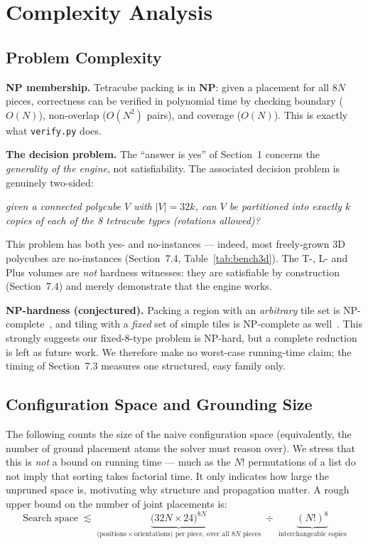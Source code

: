 \documentclass[a4paper,UKenglish,cleveref,autoref]{lipics-v2021}
\begin{document}
\section{Complexity Analysis}

\subsection{Problem Complexity}

\textbf{NP membership.}  Tetracube packing is in $\mathbf{NP}$: given a
placement for all $8N$ pieces, correctness can be verified in polynomial time
by checking boundary ($O(N)$), non-overlap ($O(N^2)$ pairs), and coverage
($O(N)$).  This is exactly what \texttt{verify.py} does.

\textbf{The decision problem.}  The ``answer is yes'' of Section~1 concerns the
\emph{generality of the engine}, not satisfiability.  The associated decision
problem is genuinely two-sided:

\begin{center}
\emph{given a connected polycube $V$ with $|V| = 32k$, can $V$ be partitioned
into exactly $k$ copies of each of the 8 tetracube types (rotations allowed)?}
\end{center}

This problem has both yes- and no-instances --- indeed, most freely-grown 3D
polycubes are no-instances (Section~7.4, Table~\ref{tab:bench3d}).  The T-, L-
and Plus volumes are \emph{not} hardness witnesses: they are satisfiable by
construction (Section~7.4) and merely demonstrate that the engine works.

\textbf{NP-hardness (conjectured).}  Packing a region with an \emph{arbitrary}
tile set is NP-complete~\cite{demaine2007,gareyjohnson1979}, and tiling with a
\emph{fixed} set of simple tiles is NP-complete as well~\cite{moore2001}.  This
strongly suggests our fixed-8-type problem is NP-hard, but a complete reduction
is left as future work.  We therefore make no worst-case running-time claim;
the timing of Section~7.3 measures one structured, easy family only.

\subsection{Configuration Space and Grounding Size}

The following counts the size of the naive configuration space (equivalently,
the number of ground placement atoms the solver must reason over).  We stress
that this is \emph{not} a bound on running time --- much as the $N!$ permutations
of a list do not imply that sorting takes factorial time.  It only indicates how
large the unpruned space is, motivating why structure and propagation matter.
A rough upper bound on the number of joint placements is:
\[
  \text{Search space} \;\lesssim\;
  \underbrace{\bigl(32N \times 24\bigr)^{8N}}_{\text{(positions} \times \text{orientations) per piece, over all } 8N \text{ pieces}}
  \;\div\;
  \underbrace{(N!)^{8}}_{\text{interchangeable copies}}
\]
\end{document}
